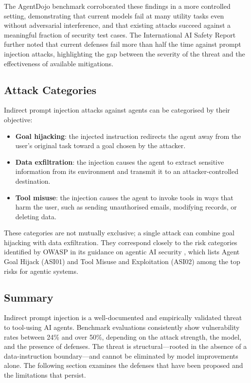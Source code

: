 The AgentDojo benchmark \parencite{debenedetti2024agentdojo} corroborated these findings in a more controlled setting, demonstrating that current models fail at many utility tasks even without adversarial interference, and that existing attacks succeed against a meaningful fraction of security test cases.  The International AI Safety Report \parencite{aisafety2025international} further noted that current defenses fail more than half the time against prompt injection attacks, highlighting the gap between the severity of the threat and the effectiveness of available mitigations.

\subsection{Attack Categories}

Indirect prompt injection attacks against agents can be categorised by their objective:

\begin{itemize}[nosep]
  \item \textbf{Goal hijacking}: the injected instruction redirects the agent away from the user's original task toward a goal chosen by the attacker.
  \item \textbf{Data exfiltration}: the injection causes the agent to extract sensitive information from its environment and transmit it to an attacker-controlled destination.
  \item \textbf{Tool misuse}: the injection causes the agent to invoke tools in ways that harm the user, such as sending unauthorised emails, modifying records, or deleting data.
\end{itemize}

These categories are not mutually exclusive; a single attack can combine goal hijacking with data exfiltration.  They correspond closely to the risk categories identified by OWASP in its guidance on agentic AI security \parencite{owasp2026agentic}, which lists Agent Goal Hijack (ASI01) and Tool Misuse and Exploitation (ASI02) among the top risks for agentic systems.

\subsection{Summary}

Indirect prompt injection is a well-documented and empirically validated threat to tool-using AI agents.  Benchmark evaluations consistently show vulnerability rates between 24\% and over 50\%, depending on the attack strength, the model, and the presence of defenses.  The threat is structural---rooted in the absence of a data-instruction boundary---and cannot be eliminated by model improvements alone.  The following section examines the defenses that have been proposed and the limitations that persist.


